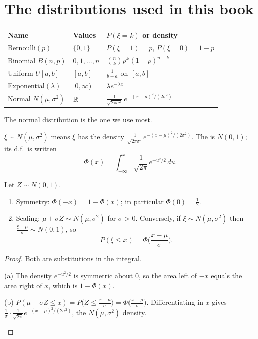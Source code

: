 \section{The distributions used in this book}

\begin{center}
\renewcommand{\arraystretch}{1.35}
\begin{tabular}{@{}lll@{}}
\toprule
Name & Values & $P(\xi=k)$ or density \\
\midrule
Bernoulli$(p)$ & $\{0,1\}$ & $P(\xi=1)=p$, $P(\xi=0)=1-p$ \\
Binomial $B(n,p)$ & $0,1,\dots,n$ & $\binom nk p^k(1-p)^{n-k}$ \\
Uniform $U[a,b]$ & $[a,b]$ & $\frac1{b-a}$ on $[a,b]$ \\
Exponential$(\lambda)$ & $[0,\infty)$ & $\lambda e^{-\lambda x}$ \\
Normal $N(\mu,\sigma^2)$ & $\mathbb{R}$ & $\frac{1}{\sqrt{2\pi\sigma^2}}\,e^{-(x-\mu)^2/(2\sigma^2)}$ \\
\bottomrule
\end{tabular}
\end{center}

The normal distribution is the one we use most.

\begin{definition}
\label{def:normal}
$\xi\sim N(\mu,\sigma^2)$ means $\xi$ has the density $\frac{1}{\sqrt{2\pi\sigma^2}}e^{-(x-\mu)^2/(2\sigma^2)}$. The  is $N(0,1)$; its d.f.\ is written
\[
  \Phi(x)=\int_{-\infty}^x\frac{1}{\sqrt{2\pi}}e^{-u^2/2}\,du .
\]
\end{definition}

\begin{result}
\label{res:normal}
Let $Z\sim N(0,1)$.
\begin{enumerate}[label=(\alph*)]
  \item Symmetry: $\Phi(-x)=1-\Phi(x)$; in particular $\Phi(0)=\frac12$.
  \item Scaling: $\mu+\sigma Z\sim N(\mu,\sigma^2)$ for $\sigma>0$. Conversely, if $\xi\sim N(\mu,\sigma^2)$ then $\frac{\xi-\mu}{\sigma}\sim N(0,1)$, so
  \[
    P(\xi\le x)=\Phi\Big(\frac{x-\mu}{\sigma}\Big).
  \]
\end{enumerate}
\end{result}
\begin{proof}
Both are substitutions in the integral.
\begin{steps}
  \item (a) The density $e^{-u^2/2}$ is symmetric about $0$, so the area left of $-x$ equals the area right of $x$, which is $1-\Phi(x)$.
  \item (b) $P(\mu+\sigma Z\le x)=P\big(Z\le\frac{x-\mu}{\sigma}\big)=\Phi\big(\frac{x-\mu}{\sigma}\big)$. Differentiating in $x$ gives $\frac1\sigma\cdot\frac{1}{\sqrt{2\pi}}e^{-(x-\mu)^2/(2\sigma^2)}$, the $N(\mu,\sigma^2)$ density. \qedhere
\end{steps}
\end{proof}

